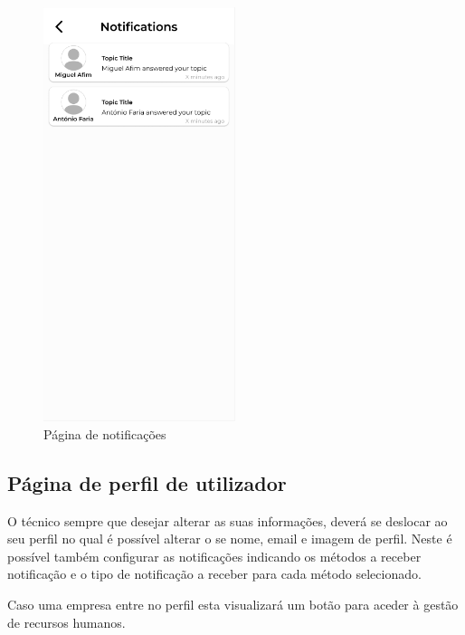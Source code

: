 \begin{figure}[htb]
    \centering
    \includegraphics[width=0.5\textwidth]{images/mockups/notifications.png}
    \caption{Página de notificações}
    \label{fig:29}
\end{figure}

\newpage

\subsection{Página de perfil de utilizador}

O técnico sempre que desejar alterar as suas informações, deverá se deslocar ao seu perfil no qual é possível
alterar o se nome, email e imagem de perfil. Neste é possível também configurar as notificações indicando os métodos
a receber notificação e o tipo de notificação a receber para cada método selecionado.

Caso uma empresa entre no perfil esta visualizará um botão para aceder à gestão de recursos humanos.

